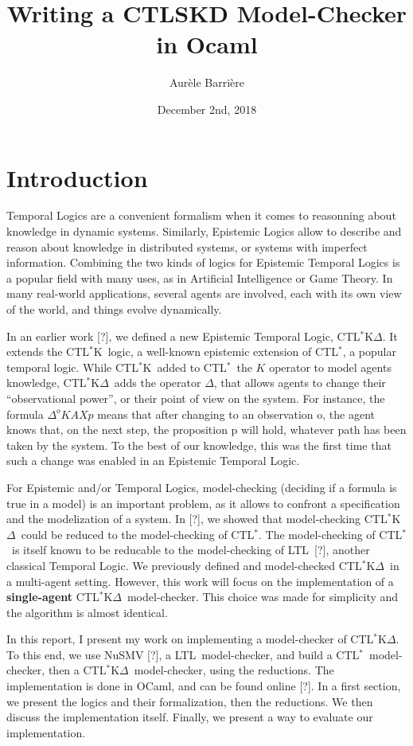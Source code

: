 \documentclass{acmart}
\title{Writing a CTLSKD Model-Checker in Ocaml}
\author{Aur\`ele Barri\`ere}
\date{December 2nd, 2018}
\def\ctls{CTL$^{*}$}
\def\ctlsk{CTL$^{*}$K}
\def\ctlskd{CTL$^{*}$K$\Delta$}
\def\ltl{LTL}
\def\A{\mathit{A}}
\def\X{\mathit{X}}
\def\K{\mathit{K}}
\def\D#1{\Delta^{#1}}
\begin{document}
\maketitle

\section{Introduction}

Temporal Logics are a convenient formalism when it comes to reasonning about knowledge in dynamic systems.
Similarly, Epistemic Logics allow to describe and reason about knowledge in distributed systems, or systems with imperfect information.
Combining the two kinds of logics for Epistemic Temporal Logics is a popular field with many uses, as in Artificial Intelligence or Game Theory.
In many real-world applications, several agents are involved, each with its own view of the world, and things evolve dynamically.

In an earlier work [?], we defined a new Epistemic Temporal Logic, \ctlskd.
It extends the \ctlsk\ logic, a well-known epistemic extension of \ctls, a popular temporal logic.
While \ctlsk\ added to \ctls\ the $\K$ operator to model agents knowledge, \ctlskd\ adds the operator $\Delta$, that allows agents to change their ``observational power'', or their point of view on the system.
For instance, the formula $\D{o}\K\A\X p$ means that after changing to an observation o, the agent knows that, on the next step, the proposition p will hold, whatever path has been taken by the system.
To the best of our knowledge, this was the first time that such a change was enabled in an Epistemic Temporal Logic.

For Epistemic and/or Temporal Logics, model-checking (deciding if a formula is true in a model) is an important problem, as it allows to confront a specification and the modelization of a system.
In [?], we showed that model-checking \ctlskd\ could be reduced to the model-checking of \ctls. The model-checking of \ctls\ is itself known to be reducable to the model-checking of \ltl\ [?], another classical Temporal Logic.
We previously defined and model-checked \ctlskd\ in a multi-agent setting. However, this work will focus on the implementation of a \textbf{single-agent} \ctlskd\ model-checker. This choice was made for simplicity and the algorithm is almost identical.

In this report, I present my work on implementing a model-checker of \ctlskd. To this end, we use NuSMV [?], a \ltl\ model-checker, and build a \ctls\ model-checker, then a  \ctlskd\ model-checker, using the reductions.
The implementation is done in OCaml, and can be found online [?]. In a first section, we present the logics and their formalization, then the reductions. We then discuss the implementation itself. Finally, we present a way to evaluate our implementation.
\end{document}
